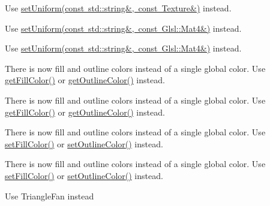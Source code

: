 \begin{DoxyRefList}
%
Use \mbox{\hyperlink{classsf_1_1_shader_a7806a29ffbd0ee9251256a9e7265d479}{set\+Uniform(const std\+::string\&, const Texture\&)}} instead. 
\item[Member \mbox{\hyperlink{classsf_1_1_shader_a398a802fc5295ab69b0317892b0f0c75}{sf\+::Shader\+::set\+Parameter}} (const std\+::string \&name, const \mbox{\hyperlink{classsf_1_1_transform}{Transform}} \&transform)]\label{deprecated__deprecated000013}%
%
Use \mbox{\hyperlink{classsf_1_1_shader_aca5c55c4a3b23d21e33dbdaab7990755}{set\+Uniform(const std\+::string\&, const Glsl\+::\+Mat4\&)}} instead.

\label{deprecated__deprecated000036}%
%
Use \mbox{\hyperlink{classsf_1_1_shader_aca5c55c4a3b23d21e33dbdaab7990755}{set\+Uniform(const std\+::string\&, const Glsl\+::\+Mat4\&)}} instead. 
\item[Member \mbox{\hyperlink{classsf_1_1_text_a810cc4aa8eb5998f9eb9d02b1c099660}{sf\+::Text\+::get\+Color}} () const]\label{deprecated__deprecated000017}%
%
There is now fill and outline colors instead of a single global color. Use \mbox{\hyperlink{classsf_1_1_text_a10400757492ec7fa97454488314ca39b}{get\+Fill\+Color()}} or \mbox{\hyperlink{classsf_1_1_text_ade9256ff9d43c9481fcf5f4003fe0141}{get\+Outline\+Color()}} instead.

\label{deprecated__deprecated000040}%
%
There is now fill and outline colors instead of a single global color. Use \mbox{\hyperlink{classsf_1_1_text_a10400757492ec7fa97454488314ca39b}{get\+Fill\+Color()}} or \mbox{\hyperlink{classsf_1_1_text_ade9256ff9d43c9481fcf5f4003fe0141}{get\+Outline\+Color()}} instead. 
\item[Member \mbox{\hyperlink{classsf_1_1_text_a6ce65272d6d63ed01118366e92c68132}{sf\+::Text\+::set\+Color}} (const \mbox{\hyperlink{classsf_1_1_color}{Color}} \&color)]\label{deprecated__deprecated000039}%
%
There is now fill and outline colors instead of a single global color. Use \mbox{\hyperlink{classsf_1_1_text_ab7bb3babac5a6da1802b2c3e1a3e6dcc}{set\+Fill\+Color()}} or \mbox{\hyperlink{classsf_1_1_text_aa19ec69c3b894e963602a6804ca68fe4}{set\+Outline\+Color()}} instead.

\label{deprecated__deprecated000016}%
%
There is now fill and outline colors instead of a single global color. Use \mbox{\hyperlink{classsf_1_1_text_ab7bb3babac5a6da1802b2c3e1a3e6dcc}{set\+Fill\+Color()}} or \mbox{\hyperlink{classsf_1_1_text_aa19ec69c3b894e963602a6804ca68fe4}{set\+Outline\+Color()}} instead. 
\item[Member \mbox{\hyperlink{group__graphics_gga5ee56ac1339984909610713096283b1ba698ecd8ec938b4132412b8da44a1a6be}{sf\+::Triangles\+Fan}} ]\label{deprecated__deprecated000003}%
%
Use Triangle\+Fan instead 


\end{DoxyRefList}
